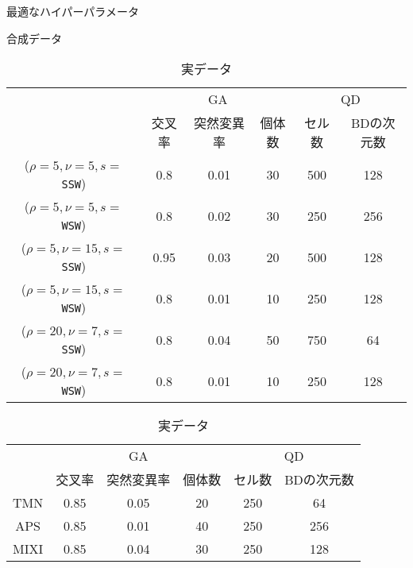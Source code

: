 \documentclass[uplatex,11pt,openany]{ujreport}
\begin{document}
        \begin{table}[H]
            \caption{最適なハイパーパラメータ}
            \label{tab:hyperparameter}
            \centering

            \begin{subtable}[h]{\textwidth}
                \centering
                \caption{合成データ}
                \begin{tabular}{c|ccc|cc}
                    \hline
                                            & \multicolumn{3}{c|}{GA} & \multicolumn{2}{c}{QD} \\
                                            & 交叉率    & 突然変異率  & 個体数  & セル数      & BDの次元数      \\  \hline
                    ($\rho=5,\nu=5, s=$\texttt{SSW})  & 0.8    & 0.01   & 30   & 500      & 128         \\
                    ($\rho=5,\nu=5, s=$\texttt{WSW})  & 0.8    & 0.02   & 30   & 250      & 256         \\
                    ($\rho=5,\nu=15, s=$\texttt{SSW}) & 0.95   & 0.03   & 20   & 500      & 128         \\
                    ($\rho=5,\nu=15, s=$\texttt{WSW}) & 0.8    & 0.01   & 10   & 250      & 128         \\
                    ($\rho=20, \nu=7, s=$\texttt{SSW}) & 0.8    & 0.04   & 50   & 750      & 64          \\
                    ($\rho=20, \nu=7, s=$\texttt{WSW}) & 0.8    & 0.01   & 10   & 250      & 128         \\ \hline
                \end{tabular}
            \end{subtable}

            \vspace{1zh}

            \begin{subtable}[h]{\textwidth}
                \centering
                \caption{実データ}
                \begin{tabular}{c|ccc|cc}
                    \hline
                        & \multicolumn{3}{c|}{GA} & \multicolumn{2}{c}{QD} \\
                        & 交叉率   & 突然変異率   & 個体数   & セル数      & BDの次元数      \\ \hline
                    TMN  & 0.85   & 0.05    & 20    & 250      & 64         \\
                    APS  & 0.85   & 0.01    & 40    & 250      & 256         \\
                    MIXI & 0.85   & 0.04    & 30    & 250      & 128         \\ \hline
                \end{tabular}
            \end{subtable}

        \end{table}
\end{document}
